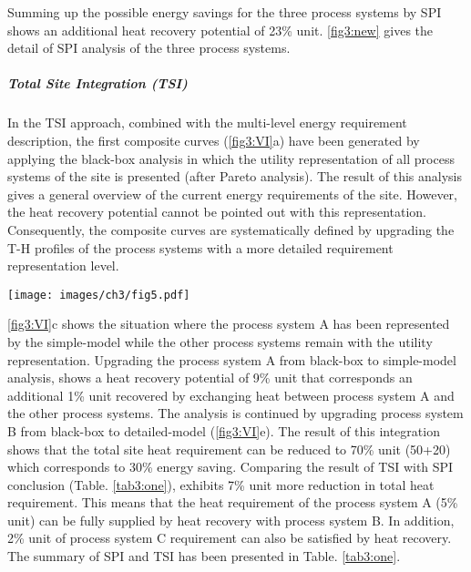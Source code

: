  Summing up the possible energy savings for the three process systems by SPI shows an additional heat recovery potential of 23\% unit. \cref{fig3:new} gives the detail of SPI analysis of the three process systems.
 
\subparagraph{Total Site Integration (TSI)}

In the TSI approach, combined with the multi-level energy requirement description, the first composite curves (\cref{fig3:VI}a) have been generated by applying the black-box analysis in which the utility representation of all process systems of the site is presented (after Pareto analysis). The result of this analysis gives a general overview of the current energy requirements of the site. However, the heat recovery potential cannot be pointed out with this representation. Consequently, the composite curves are systematically defined by upgrading the T-H profiles of the process systems with a more detailed requirement representation level.
 
 \begin{figure*}[!ht]
\vspace{5mm}
\begin{center}
\texttt{[image: images/ch3/fig5.pdf]}
\caption{Systematic improvement of Composite and Grand Composite Curves of total site by combining different energy requirement levels (100\% corresponds to the present total site consumption)}
\label{fig3:VI}
\end{center}
\end{figure*}

 \cref{fig3:VI}c shows the situation where the process system A has been represented by the simple-model while the other process systems remain with the utility representation. Upgrading the process system A from black-box to simple-model analysis, shows a heat recovery potential of 9\% unit that corresponds an additional 1\% unit recovered by exchanging heat between process system A and the other process systems. The analysis is continued by upgrading process system B from black-box to detailed-model (\cref{fig3:VI}e). The result of this integration shows that the total site heat requirement can be reduced to 70\% unit (50+20) which corresponds to 30\% energy saving. Comparing the result of TSI with SPI conclusion (Table. \ref{tab3:one}), exhibits 7\% unit more reduction in total heat requirement. This means that the heat requirement of the process system A (5\% unit) can be fully supplied by heat recovery with process system B. In addition, 2\% unit of process system C requirement can also be satisfied by heat recovery. The summary of SPI and TSI has been presented in Table. \ref{tab3:one}. 
 
